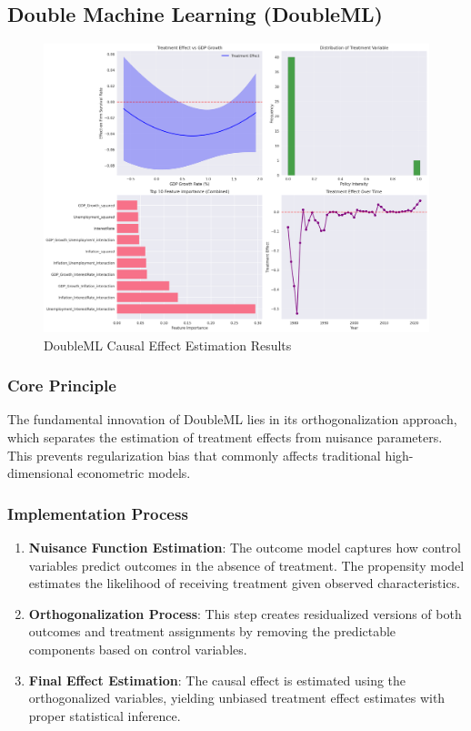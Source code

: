 \subsection{Double Machine Learning (DoubleML)}\label{subsec:doubleml}
\begin{figure}[H]
    \centering
    \includegraphics[width=\textwidth]{figures/dml_analysis_results.png}
    \caption{DoubleML Causal Effect Estimation Results}
    \label{fig:dml_analysis_results}
\end{figure}
\subsubsection{Core Principle}
The fundamental innovation of DoubleML lies in its orthogonalization approach, which separates the estimation of treatment effects from nuisance parameters. This prevents regularization bias that commonly affects traditional high-dimensional econometric models.

\subsubsection{Implementation Process}
\begin{enumerate}
    \item \textbf{Nuisance Function Estimation}: The outcome model captures how control variables predict outcomes in the absence of treatment. The propensity model estimates the likelihood of receiving treatment given observed characteristics.
    \item \textbf{Orthogonalization Process}: This step creates residualized versions of both outcomes and treatment assignments by removing the predictable components based on control variables.
    \item \textbf{Final Effect Estimation}: The causal effect is estimated using the orthogonalized variables, yielding unbiased treatment effect estimates with proper statistical inference.
\end{enumerate}


